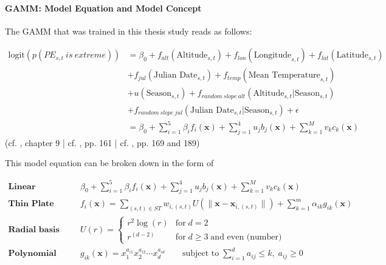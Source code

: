 \documentclass[
  12pt,
]{article}
\begin{document}
\endgroup

\clearpage

\hypertarget{gamm-model-equation-and-model-concept}{%
\paragraph{\texorpdfstring{GAMM: Model Equation and Model Concept
\newline}{GAMM: Model Equation and Model Concept }}\label{gamm-model-equation-and-model-concept}}

The GAMM that was trained in this thesis study reads as follows:

\vspace{1cm}

\begin{mdframed}[leftline = true, rightline = true, topline = false, bottomline = false, frametitle = {Generalized Additive Mixed Model - Model Equation}]
\begin{align}
\text{logit}(p(PE_{s,t}\:is\:extreme)) &= \beta_{0} + f_{alt}(\text{Altitude}_{s,t}) + f_{lon}(\text{Longitude}_{s,t}) + f_{lat}(\text{Latitude}_{s,t}) \nonumber \\
&+ f_{jul}(\text{Julian Date}_{s,t}) + f_{temp}(\text{Mean Temperature}_{s,t}) \nonumber \\
&+ u(\text{Season}_{s,t}) + f_{random\:slope\:alt}(\text{Altitude}_{s,t} | \text{Season}_{s,t}) \nonumber \\ &+ f_{random\:slope\:jul}(\text{Julian Date}_{s,t} | \text{Season}_{s,t}) + \epsilon  \nonumber \\
&= \beta_0+\sum_{i = 1}^{5} \beta_i f_i(\boldsymbol{x}) + \sum_{j = 1}^{4} u_j b_j(\boldsymbol{x}) + \sum_{k = 1}^{M} v_k c_k(\boldsymbol{x})
\end{align}
(cf. \cite{Zumel.2014}, chapter 9 | cf. \cite{Wood.2017}, pp. 161 | cf. \cite{Wikle.2019}, pp. 169 and 189)
\end{mdframed}

This model equation can be broken down in the form of

\begin{align}
\textbf{Linear Predictor} \qquad & \beta_0+\sum_{i = 1}^{5} \beta_i f_i(\boldsymbol{x}) + \sum_{j = 1}^{4} u_j b_j(\boldsymbol{x}) + \sum_{k = 1}^{M} v_k c_k(\boldsymbol{x})&\label{eq:gamm_eq} \\
\textbf{Thin Plate Regression Spline} \qquad &f_i(\boldsymbol{x}) = \sum_{(s,t)\in ST} w_{i,(s,t)} U(\lVert \boldsymbol{x} - \boldsymbol{x}_{i,(s,t)} \rVert) + \sum_{k = 1}^{m} \alpha_{ik} g_{ik}(\boldsymbol{x}) &\label{eq:tps_eq} \\
\textbf{Radial basis function} \qquad &U(r) = \begin{cases}
r^2 \log (r) & \text{for} \; d = 2 \\
r^{(d - 2)} & \text{for} \; d \geq 3 \; \text{and even (number)}
\end{cases} &\label{eq:rbf_eq} \\
\textbf{Polynomial basis functions} \qquad &g_{ik}(\boldsymbol{x}) = x_1^{a_{i1}} x_2^{a_{i2}} \cdots x_d^{a_{id}} \qquad \text{subject to} \; \sum_{i = 1}^{d} a_{ij} \leq k, \; a_{ij} \geq 0 &\label{eq:poly_eq}
\end{align}
\end{document}
